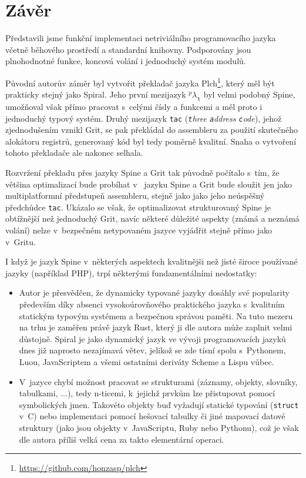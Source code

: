 \chapter{Závěr}

Představili jsme funkční implementaci netriviálního programovacího jazyka včetně
běhového prostředí a standardní knihovny. Podporovány jsou plnohodnotné funkce,
koncová volání i jednoduchý systém modulů.

Původní autorův záměr byl vytvořit překladač jazyka
Plch\footnote{\url{https://github.com/honzasp/plch}}, který měl být prakticky
stejný jako Spiral. Jeho první mezijazyk $^p\lambda_\chi$ byl velmi podobný
Spine, umožňoval však přímo pracovat s~celými čísly a funkcemi a měl proto i
jednoduchý typový systém. Druhý mezijazyk \texttt{tac} (\emph{\texttt{t}hree
\texttt{a}ddress \texttt{c}ode}), jehož zjednodušením vznikl Grit, se pak
překládal do assembleru za použití skutečného alokátoru registrů, generovaný kód
byl tedy poměrně kvalitní. Snaha o vytvoření tohoto překladače ale nakonec
selhala.

Rozvržení překladu přes jazyky Spine a Grit tak původně počítalo s~tím, že
většina optimalizací bude probíhat v~ jazyku Spine a Grit
bude sloužit jen jako multiplatformní předstupeň assembleru, stejně jako jako
jeho neúspěšný předchůdce \texttt{tac}. Ukázalo se však, že optimalizovat
strukturovaný Spine je obtížnější než jednoduchý Grit, navíc některé důležité
aspekty (známá a neznámá volání) nelze v~bezpečném netypovaném jazyce vyjádřit
stejně přímo jako v~Gritu.

I když je jazyk Spine v~některých aspektech kvalitnějši než jisté široce
používané jazyky (například  PHP), trpí některými fundamentálními
nedostatky:

\begin{itemize}
  \item Autor je přesvědčen, že dynamicky typované jazyky dosáhly své popularity
    především díky absenci vysokoúrovňového praktického jazyka s~kvalitním
    statickým typovým systémem a bezpečnou správou paměti. Na tuto mezeru na
    trhu je zaměřen právě jazyk Rust, který ji dle autora může zaplnit velmi
    důstojně. Spiral je jako dynamický jazyk ve vývoji programovacích jazyků
    dnes již naprosto nezajímavá větev, jelikož se zde tísní spolu s~Pythonem,
    Luou, JavaScriptem a všemi ostatními deriváty Scheme a Lispu vůbec.

  \item V~jazyce chybí možnost pracovat se strukturami (záznamy, objekty,
    slovníky, tabulkami, ...), tedy n-ticemi, k~jejichž prvkům lze přistupovat
    pomocí symbolických jmen. Takovéto objekty buď vyžadují statické typování
    (\texttt{struct} v~C) nebo implementaci pomocí hešovací tabulky či jiné
    mapovací datové struktury (jako jsou objekty v~JavaScriptu, Ruby nebo
    Pythonu), což je však dle autora příliš velká cena za takto elementární
    operaci.
\end{itemize}


